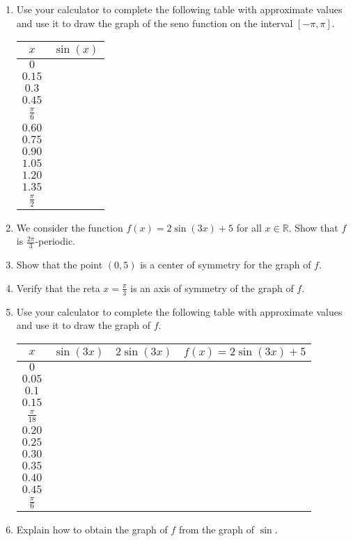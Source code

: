 \begin{enumerate}
\item Use your calculator to complete the following table with
  approximate values and use it to draw the graph of the seno function on
  the interval $[-\pi, \pi]$.
    \begin{center}
    \begin{tabular}{| c | c | }
      \hline
      $x$ & $\sin{(x)}$ \\
      \hline
      $0$ & \\
      $0.15$ & \\
      $0.3$ & \\
      $0.45$ & \\
      $\frac{\pi}{6}$ & \\
      $0.60$ & \\
      $0.75$ & \\
      $0.90$ & \\
      $1.05$ & \\
      $1.20$ & \\
      $1.35$ & \\
      $\frac{\pi}{2}$ & \\
      \hline
    \end{tabular}
  \end{center}

\item
  We consider the function $f(x) = 2 \sin{(3x)} + 5$ for all
  $x \in \mathbb R$.
  Show that $f$ is $\frac{2\pi}{3}$-periodic.
\item Show that the point $(0,5)$ is a center of symmetry for the graph of $f$.
\item Verify that the reta
  $x = \frac{\pi}{3}$ is an axis of symmetry of the graph of $f$.

\item Use your calculator to complete the following table with
  approximate values and use it to draw the graph of $f$.
  \begin{center}
    \begin{tabular}{| c | c | c | c | }
      \hline
      $x$ & $\sin{(3x)}$ & $2\sin{(3x)}$ & $f(x) = 2\sin{(3x)}+5$ \\
      \hline
      $0$ & & & \\
      $0.05$ & & & \\
      $0.1$ & & & \\
      $0.15$ & & & \\
      $\frac{\pi}{18}$ & & & \\
      $0.20$ & & & \\
      $0.25$ & & & \\
      $0.30$ & & & \\
      $0.35$ & & & \\
      $0.40$ & & & \\
      $0.45$ & & & \\
      $\frac{\pi}{6}$ & & & \\
      \hline
    \end{tabular}
  \end{center}

\item Explain how to obtain the graph of $f$ from the graph of $\sin$.
\end{enumerate}
